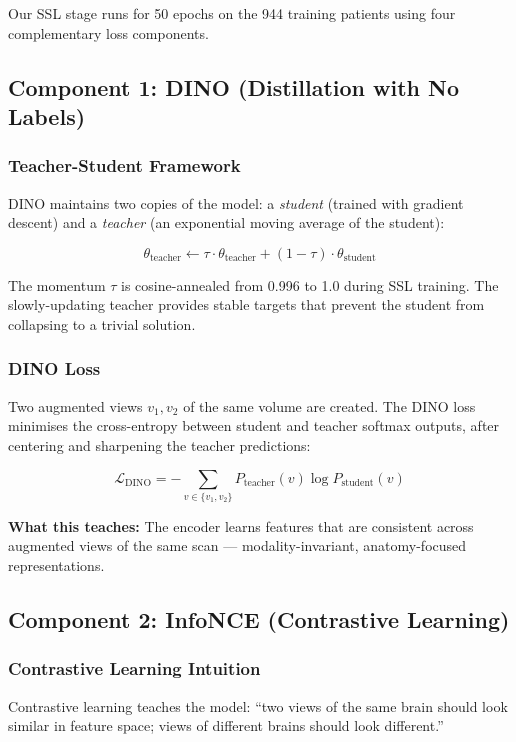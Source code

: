 \documentclass[12pt,a4paper]{article}
\begin{document}
Our SSL stage runs for 50 epochs on the 944 training patients using four complementary loss components.

\subsection{Component 1: DINO (Distillation with No Labels)}

\subsubsection{Teacher-Student Framework}
DINO maintains two copies of the model: a \emph{student} (trained with gradient descent) and a \emph{teacher} (an exponential moving average of the student):

\[
\theta_{\text{teacher}} \leftarrow \tau \cdot \theta_{\text{teacher}} + (1-\tau) \cdot \theta_{\text{student}}
\]

The momentum $\tau$ is cosine-annealed from 0.996 to 1.0 during SSL training. The slowly-updating teacher provides stable targets that prevent the student from collapsing to a trivial solution.

\subsubsection{DINO Loss}
Two augmented views $v_1, v_2$ of the same volume are created. The DINO loss minimises the cross-entropy between student and teacher softmax outputs, after centering and sharpening the teacher predictions:

\[
\mathcal{L}_{\text{DINO}} = -\sum_{v \in \{v_1, v_2\}} P_{\text{teacher}}(v) \log P_{\text{student}}(v)
\]

\textbf{What this teaches:} The encoder learns features that are consistent across augmented views of the same scan --- modality-invariant, anatomy-focused representations.

\subsection{Component 2: InfoNCE (Contrastive Learning)}

\subsubsection{Contrastive Learning Intuition}
Contrastive learning teaches the model: ``two views of the same brain should look similar in feature space; views of different brains should look different.''
\end{document}
